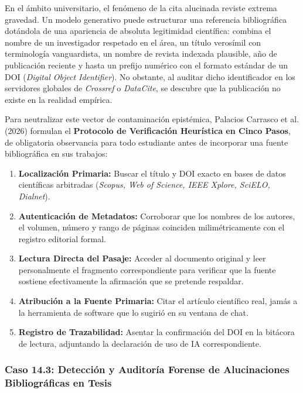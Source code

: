 En el ámbito universitario, el fenómeno de la cita alucinada reviste extrema gravedad. Un modelo generativo puede estructurar una referencia bibliográfica dotándola de una apariencia de absoluta legitimidad científica: combina el nombre de un investigador respetado en el área, un título verosímil con terminología vanguardista, un nombre de revista indexada plausible, año de publicación reciente y hasta un prefijo numérico con el formato estándar de un DOI (\textit{Digital Object Identifier}). No obstante, al auditar dicho identificador en los servidores globales de \textit{Crossref} o \textit{DataCite}, se descubre que la publicación no existe en la realidad empírica.

Para neutralizar este vector de contaminación epistémica, Palacios Carrasco et al. (2026) formulan el \textbf{Protocolo de Verificación Heurística en Cinco Pasos}, de obligatoria observancia para todo estudiante antes de incorporar una fuente bibliográfica en sus trabajos:
\begin{enumerate}
    \item \textbf{Localización Primaria:} Buscar el título y DOI exacto en bases de datos científicas arbitradas (\textit{Scopus, Web of Science, IEEE Xplore, SciELO, Dialnet}).
    \item \textbf{Autenticación de Metadatos:} Corroborar que los nombres de los autores, el volumen, número y rango de páginas coinciden milimétricamente con el registro editorial formal.
    \item \textbf{Lectura Directa del Pasaje:} Acceder al documento original y leer personalmente el fragmento correspondiente para verificar que la fuente sostiene efectivamente la afirmación que se pretende respaldar.
    \item \textbf{Atribución a la Fuente Primaria:} Citar el artículo científico real, jamás a la herramienta de software que lo sugirió en su ventana de chat.
    \item \textbf{Registro de Trazabilidad:} Asentar la confirmación del DOI en la bitácora de lectura, adjuntando la declaración de uso de IA correspondiente.
\end{enumerate}

\subsubsection{Caso 14.3: Detección y Auditoría Forense de Alucinaciones Bibliográficas en Tesis}

